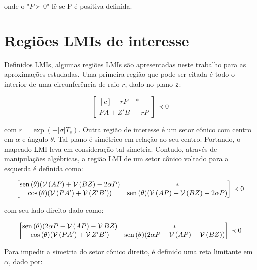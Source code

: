 \noindent onde o "$P \succ 0$" lê-se P é positiva definida.

\section{Regiões LMIs de interesse}
Definidos LMIs, algumas regiões LMIs são apresentadas neste trabalho para as aproximações estudadas. Uma primeira região que pode ser citada é todo o interior de uma circunferência de raio $r$, dado no plano $\operatorname{\mathrm{z}}$:

\begin{equation}
  \begin{bmatrix*}[c]
    -rP       & * \\
    PA + Z'B  & -rP
  \end{bmatrix*}
  \prec 0\label{eq:LMIEstabilidadeRelativa}
\end{equation}

\noindent com $r = \exp{\left(-|\sigma|T_s\right)}$. Outra região de interesse é um setor cônico com centro em $\alpha$ e ângulo $\theta$. Tal plano é simétrico em relação ao seu centro. Portando, o mapeado LMI leva em consideração tal simetria. Contudo, através de manipulações algébricas, a região LMI de um setor cônico voltado para a esquerda é definida como:

\begin{equation}
  \begin{bmatrix*}[c]
    \sen{(\theta)(\Herm{(AP)} + \Herm{(BZ)} -2\alpha P)} &  * \\
    \cos{(\theta)(\herm{(PA')} + \herm{(Z'B')})}      &  \sen{(\theta)(\Herm{(AP)} + \Herm{(BZ)} -2\alpha P)}
  \end{bmatrix*}
  \prec 0\label{eq:LMIESetorConicoEsquerdo}
\end{equation}

\noindent com seu lado direito dado como:

\begin{equation}
  \begin{bmatrix*}[c]
    \sen{(\theta)(2\alpha P - \Herm{(AP)} - \Herm{BZ})} & * \\
    \cos{(\theta)(\herm{(PA')} + \herm{Z'B'})}       & \sen{(\theta)(2\alpha P - \Herm{(AP)} - \Herm{(BZ)})}
  \end{bmatrix*}
  \prec 0\label{eq:LMIESetorConicoDireito}
\end{equation}

Para impedir a simetria do setor cônico direito, é definido uma reta limitante em $\alpha$, dado por:

